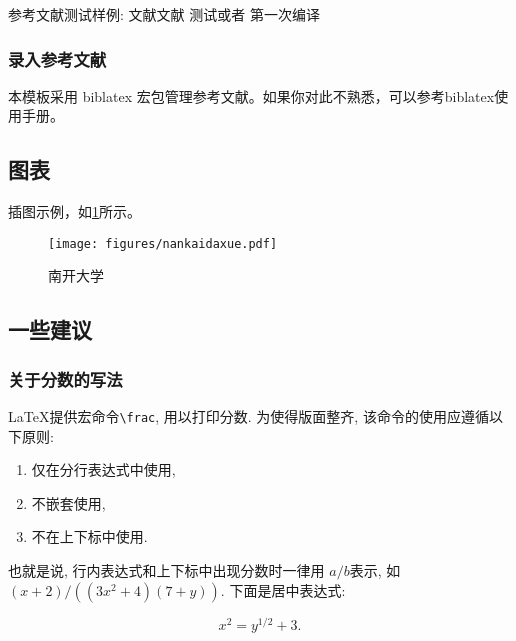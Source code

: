 \documentclass{nkuthesis}
\begin{document}
参考文献测试样例:
\cite{ChenCheChen2001,Nadkarni-1992,Hua-Wang-1973}
文献\cite{ZhuKeZhen,Huo}文献\cite{JiangXiZhou,Timoshenko,Zhang-Wang}
\cite{ZhuKeZhen}
测试\citep{PQEMU}或者\citep{li1988ivy}
第一次编译\cite{hong2012hqemu}\cite{zaharia2010spark}\cite{wenwenasplos2018}

\subsubsection{录入参考文献}

本模板采用 biblatex 宏包管理参考文献。如果你对此不熟悉，可以参考biblatex使用手册。

\subsection{图表}

插图示例，如\ref{fig:nku}所示。

\begin{figure}
\centering
\texttt{[image: figures/nankaidaxue.pdf]}
\caption{南开大学}
\label{fig:nku}
\end{figure}

\subsection{一些建议}
\subsubsection{关于分数的写法}

\LaTeX 提供宏命令\verb+\frac+, 用以打印分数. 为使得版面整齐, 该命令的使用应遵循以下原则:

\begin{enumerate}
\item 仅在分行表达式中使用,
\item 不嵌套使用,
\item 不在上下标中使用.
\end{enumerate}

也就是说, 行内表达式和上下标中出现分数时一律用 $a/b$表示, 如
$(x+2)/((3x^2+4)(7+y))$. 下面是居中表达式:

\[
 x^2 = y^{1/2} +3.
\]
\end{document}

